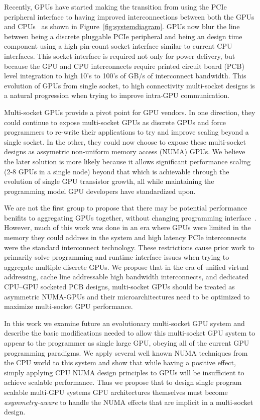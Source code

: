 Recently, GPUs have started making the transition from using the PCIe peripheral 
interface
to having improved interconnections between both the GPUs and 
CPUs~\cite{dgx,AMDINFINITYFABRIC}
as shown in Figure~\ref{fig:systemdiagram}.  GPUs now blur the line between 
being
a discrete pluggable PCIe peripheral and being an design time component using a 
high pin-count
socket interface similar to current CPU interfaces.  This socket interface is required
not only for power delivery, but because the GPU and CPU interconnects require printed
circuit board (PCB) level integration to high 10's to 100's of GB/s of interconnect bandwidth.
This evolution of GPUs from single socket, to high connectivity multi-socket designs
is a natural progression when trying to improve intra-GPU communication.

Multi-socket GPUs provide a pivot point for GPU vendors.  In one direction, they
could continue to expose multi-socket GPUs as discrete GPUs and force programmers
to re-write their applications to try and improve scaling beyond a single socket.
In the other, they could now choose to expose these multi-socket designs as assymetric
non-uniform memory access (NUMA) GPUs.  We believe the later solution is more likely
because it allows significant performance scaling (2-8 GPUs in a single node) beyond
that which is achievable through the evolution of single GPU transistor growth, all
while maintaining the programming model GPU developers have standardized upon.

We are not the first group to propose that there may be potential performance
benifits to aggregating GPUs together, without changing programming 
interface~\cite{Cabezas2015,lee2013transparent,XXX,XXX}. However, much of this work
was done in an era where GPUs were limited in the memory they could address
in the system and high latency PCIe interconnects were the standard interconnect
technology.  These restrictions cause prior work to primarily solve programming and runtime
interface issues when trying to aggregate multiple discrete GPUs.  We propose
that in the era of unified virtual addressing, cache line addressable high bandwidth
interconnects, and dedicated CPU--GPU socketed PCB designs, multi-socket GPUs
should be treated as asymmetric NUMA-GPUs and their microarchitectures need to be optimized
to maximize multi-socket GPU performance.

In this work we examine future an evolutionary multi-socket GPU system and describe the 
basic modifications needed to allow this multi-socket GPU system to appear to the programmer
as single large GPU, obeying all of the current GPU programming paradigms. We apply 
several well known NUMA techniques from the CPU world to this system and show that
while having a positive effect, simply applying CPU NUMA design principles to GPUs 
will be insufficient to achieve scalable performance.  Thus we propose that to design
single program scalable multi-GPU systems GPU architectures themselves must become
\textit{asymmetry-aware} to handle the NUMA effects that are implicit in a multi-socket
design.

